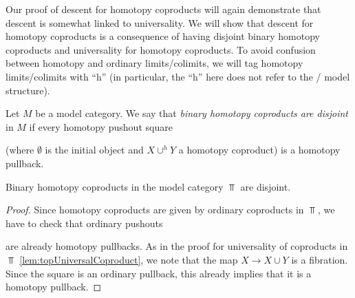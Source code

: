 Our proof of descent for homotopy coproducts will again demonstrate that descent is somewhat linked to universality.
We will show that descent for homotopy coproducts is a consequence of having disjoint binary homotopy coproducts and universality for homotopy coproducts.
To avoid confusion between homotopy and ordinary limits/colimits, we will tag homotopy limits/colimits with ``h'' (in particular, the ``h'' here does not refer to the \Strom/ model structure).
\begin{definition}
    Let $M$ be a model category.
    We say that \emph{binary homotopy coproducts are disjoint} in $M$ if every homotopy pushout square
    \begin{center}
    \end{center}
    (where $\emptyset$ is the initial object and $X\cup^h Y$ a homotopy coproduct) is a homotopy pullback.
\end{definition}
\begin{lemma}\label{lem:binCoprodDisjoint}
    Binary homotopy coproducts in the model category $\Top$ are disjoint.
    \begin{proof}
        Since homotopy coproducts are given by ordinary coproducts in $\Top$, we have to check that ordinary pushouts
        \begin{center}
        \end{center}
        are already homotopy pullbacks.
        As in the proof for universality of coproducts in $\Top$ \cref{lem:topUniversalCoproduct}, we note that the map $X\to X\cup Y$ is a fibration.
        Since the square is an ordinary pullback, this already implies that it is a homotopy pullback.
    \end{proof}
\end{lemma}
